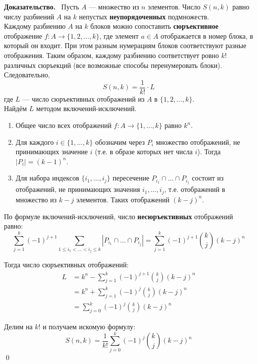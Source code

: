 \documentclass[a4paper,12pt]{article}
\newcommand{\myproof}{\textbf{Доказательство.}\ }
\begin{document}
	\myproof
	Пусть \(A\) — множество из \(n\) элементов. Число \(S(n,k)\) равно числу разбиений \(A\) на \(k\) непустых \textbf{неупорядоченных} подмножеств.\\
	
	Каждому разбиению \(A\) на \(k\) блоков можно сопоставить \textbf{сюръективное} отображение \(f: A \to \{1, 2, \dots, k\}\), где элемент \(a \in A\) отображается в номер блока, в который он входит. При этом разным нумерациям блоков соответствуют разные отображения. Таким образом, каждому разбиению соответствует ровно \(k!\) различных сюръекций (все возможные способы перенумеровать блоки).\\
	
	Следовательно,
	\[ S(n, k) = \frac{1}{k!} \cdot L \]
	где \(L\) — число сюръективных отображений из \(A\) в \(\{1, 2, \dots, k\}\).\\
	
	Найдём \(L\) методом включений-исключений.
	
	\begin{enumerate}
		\item Общее число всех отображений \(f: A \to \{1, \dots, k\}\) равно \(k^n\).
		\item Для каждого \(i \in \{1, \dots, k\}\) обозначим через \(P_i\) множество отображений, не принимающих значение \(i\) (т.е. в образе которых нет числа \(i\)). Тогда \(|P_i| = (k-1)^n\).
		\item Для набора индексов \(\{i_1, \dots, i_j\}\) пересечение \(P_{i_1} \cap \dots \cap P_{i_j}\) состоит из отображений, не принимающих значения \(i_1, \dots, i_j\), т.е. отображений в множество из \(k-j\) элементов. Таких отображений \((k-j)^n\).
	\end{enumerate}
	
	По формуле включений-исключений, число \textbf{несюръективных} отображений равно:
	\[ \sum_{j=1}^{k} (-1)^{j+1} \sum_{1 \le i_1 < \dots < i_j \le k} |P_{i_1} \cap \dots \cap P_{i_j}| = \sum_{j=1}^{k} (-1)^{j+1} \binom{k}{j} (k-j)^n \]
	
	Тогда число сюръективных отображений:
	\begin{align*}
		L &= k^n - \sum_{j=1}^{k} (-1)^{j+1} \binom{k}{j} (k-j)^n \\
		&= k^n + \sum_{j=1}^{k} (-1)^{j} \binom{k}{j} (k-j)^n \\
		&= \sum_{j=0}^{k} (-1)^{j} \binom{k}{j} (k-j)^n
	\end{align*}
	
	Делим на \(k!\) и получаем искомую формулу:
	\[ S(n, k) = \frac{1}{k!} \sum_{j=0}^{k} (-1)^j \binom{k}{j} (k-j)^n \]
	\qed
	
\end{document}
